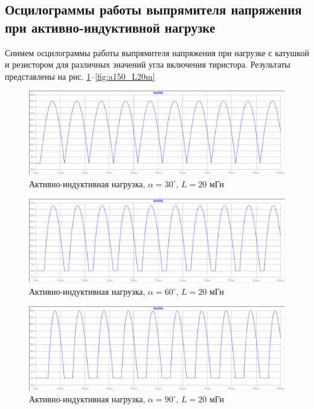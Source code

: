 \documentclass[a4paper, 12pt]{article}
\begin{document}
    \subsection{Осцилограммы работы выпрямителя напряжения при активно-индуктивной нагрузке}
    Снимем осцилограммы работы выпрямителя напряжения при нагрузке с катушкой и резистором для различных значений
    угла включения тиристора. Результаты представлены на рис. \ref{fig:a30_L20m}--\ref{fig:a150_L20m}
    \begin{figure}[H]
        \centering
        \includegraphics[scale=0.45]{a30_L20m.png}
        \captionsetup{skip=0pt}
        \caption{Активно-индуктивная нагрузка, $\alpha=30^{\circ}$, $L=20$ мГн}
        \label{fig:a30_L20m}
    \end{figure}
    \begin{figure}[H]
        \centering
        \includegraphics[scale=0.45]{a60_L20m.png}
        \captionsetup{skip=0pt}
        \caption{Активно-индуктивная нагрузка, $\alpha=60^{\circ}$, $L=20$ мГн}
        \label{fig:a60_L20m}
    \end{figure}
    \begin{figure}[H]
        \centering
        \includegraphics[scale=0.45]{a90_L20m.png}
        \captionsetup{skip=0pt}
        \caption{Активно-индуктивная нагрузка, $\alpha=90^{\circ}$, $L=20$ мГн}
        \label{fig:a90_L20m}
    \end{figure}
\end{document}
